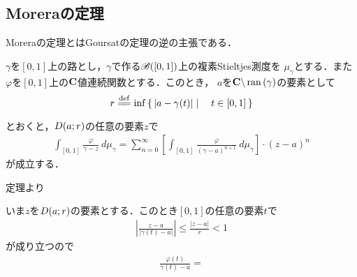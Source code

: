 \subsection{Moreraの定理}
	Moreraの定理とはGoursatの定理の逆の主張である．
	
	\begin{screen}
		\begin{thm}[正則ならば級数展開可能]
			$\gamma$を$[0,1]$上の路とし，$\gamma$で作る$\mathscr{B}([0,1])$上の複素Stieltjes測度を
			$\mu_{\gamma}$とする．また$\varphi$を$[0,1]$上の$\mathbf{C}$値連続関数とする．このとき，
			$a$を$\mathbf{C} \backslash \operatorname*{ran} \left(\gamma\right)$の要素として
			\begin{align}
				r \defeq \inf{}{\Set{|a-\gamma(t)|}{t \in [0,1]}}
			\end{align}
			とおくと，$D(a;r)$の任意の要素$z$で
			\begin{align}
				\int_{[0,1]} \frac{\varphi}{\gamma - z}\ d\mu_{\gamma}
				= \sum_{n=0}^{\infty} \left[ \int_{[0,1]} \frac{\varphi}{(\gamma - a)^{n+1}}\ d\mu_{\gamma} \right] \cdot (z-a)^{n}
			\end{align}
			が成立する．
		\end{thm}
	\end{screen}
	
	定理より
	
	\begin{sketch}
		いま$z$を$D(a;r)$の要素とする．このとき$[0,1]$の任意の要素$t$で
		\begin{align}
			\left|\frac{z-a}{|\gamma(t) - a|}\right|
			\leq \frac{|z-a|}{r}
			< 1
		\end{align}
		が成り立つので
		\begin{align}
			\frac{\varphi(t)}{\gamma(t) - a} = 
		\end{align}
	\end{sketch}
	
	\begin{screen}
		\begin{thm}[正則関数の導関数も正則]
			
		\end{thm}
	\end{screen}
	
	\begin{screen}
		\begin{thm}[Moreraの定理]
			
		\end{thm}
	\end{screen}